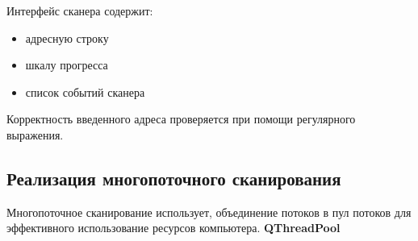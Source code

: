 Интерфейс сканера содержит:

\begin{itemize}
\item
  адресную строку
\item
  шкалу прогресса
\item
  список событий сканера
\end{itemize}

Корректность введенного адреса проверяется при помощи регулярного
выражения.

\hypertarget{ux440ux435ux430ux43bux438ux437ux430ux446ux438ux44f-ux43cux43dux43eux433ux43eux43fux43eux442ux43eux447ux43dux43eux433ux43e-ux441ux43aux430ux43dux438ux440ux43eux432ux430ux43dux438ux44f}{%
\subsection{Реализация многопоточного
сканирования}\label{ux440ux435ux430ux43bux438ux437ux430ux446ux438ux44f-ux43cux43dux43eux433ux43eux43fux43eux442ux43eux447ux43dux43eux433ux43e-ux441ux43aux430ux43dux438ux440ux43eux432ux430ux43dux438ux44f}}

Многопоточное сканирование использует, объединение потоков в пул потоков
для эффективного использование ресурсов компьютера. \textbf{QThreadPool}
